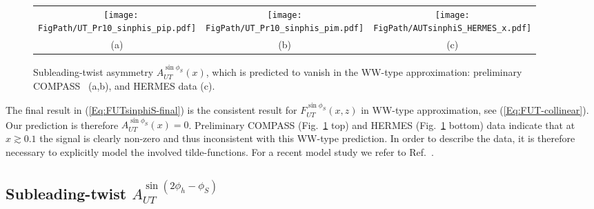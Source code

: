 \documentclass[a4paper,11pt]{article}
\newcommand{\blue}[1]{{\color{blue} #1}}
\newcommand{\ps}[1]{\blue{#1}}
\newcommand*{\FigPath}{./figs}%
\begin{document}
\begin{figure}
\centering
\begin{tabular}{ccc} \ \hspace{-8mm}
\texttt{[image: \\FigPath/UT\_Pr10\_sinphis\_pip.pdf]}&
\texttt{[image: \\FigPath/UT\_Pr10\_sinphis\_pim.pdf]}&
\texttt{[image: \\FigPath/AUTsinphiS\_HERMES\_x.pdf]}\\
{\tiny (a)}&{\tiny (b)}&{\tiny (c)}
\end{tabular}
\caption{\label{autsinphis}
 	Subleading-twist asymmetry $A_{UT}^{\sin\phi_S}(x)$, which
	is predicted to vanish in the WW-type approximation: 
	preliminary COMPASS~\cite{Parsamyan:2013fia} (a,b), 
	and HERMES data \cite{Schnell:2010zza} (c).}
\end{figure}


The final result in (\ref{Eq:FUTsinphiS-final}) is the consistent
result for $F_{UT}^{\sin\phi_S}(x,z)$ in WW-type
approximation, see (\ref{Eq:FUT-collinear}). Our prediction is
therefore $A_{UT}^{\sin\phi_S}(x)=0$. Preliminary
COMPASS \cite{Parsamyan:2013fia} (Fig.~\ref{autsinphis} top) and
HERMES \cite{Schnell:2010zza} (Fig.~\ref{autsinphis} bottom) data
indicate that at $x\gtrsim 0.1$ the signal is clearly non-zero and
thus inconsistent with this WW-type prediction. In order to
describe the data, it is therefore necessary to explicitly model
the involved tilde-functions. For a recent model study we refer
to Ref.~\cite{Mao:2014aoa}.




\newpage
\subsection{\boldmath Subleading-twist  $A_{UT}^{\sin(2\phi_h-\phi_S)}$ }
\label{Sec-7.8:FUTsin2phi-phiS}
\end{document}
